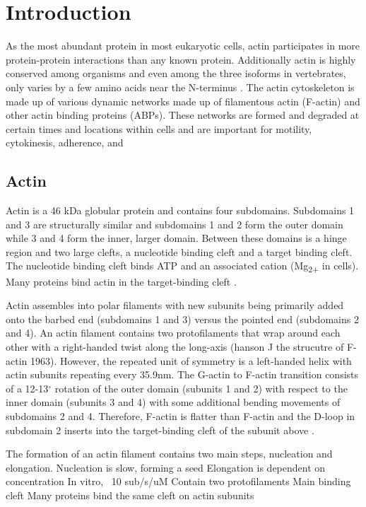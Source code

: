\chapter{Introduction}\label{ch:intro}
As the most abundant protein in most eukaryotic cells, actin participates in more protein-protein interactions than any known protein. Additionally actin is highly conserved among organisms and even among the three isoforms in vertebrates, only varies by a few amino acids near the N-terminus \cite{dominguez_actin_2011}. 
The actin cytoskeleton is made up of various dynamic networks made up of filamentous actin (F-actin) and other actin binding proteins (ABPs). These networks are formed and degraded at certain times and locations within cells and are important for motility, cytokinesis, adherence, and %

\section{Actin}\label{actin-intro}

Actin is a 46 kDa globular protein and contains four subdomains. Subdomains 1 and 3 are structurally similar and subdomains 1 and 2 form the outer domain while 3 and 4 form the inner, larger domain. Between these domains is a hinge region and two large clefts, a nucleotide binding cleft and a target binding cleft. The nucleotide binding cleft binds ATP and an associated cation (Mg\textsubscript{2+} in cells). Many proteins bind actin in the target-binding cleft \citep{dominguez_actin_2009}.

Actin assembles into polar filaments with new subunits being primarily added onto the barbed end (subdomains 1 and 3) versus the pointed end (subdomains 2 and 4). An actin filament contains two protofilaments that wrap around each other with a right-handed twist along the long-axis (hanson J the strucutre of F-actin 1963). However, the repeated unit of symmetry is a left-handed helix with  actin subunits repeating every 35.9nm. The G-actin to F-actin transition consists of a 12-13$^\circ$ rotation of the outer domain (subunits 1 and 2) with respect to the inner domain (subunits 3 and 4) with some additional bending movements of subdomains 2 and 4. Therefore, F-actin is flatter than F-actin and the D-loop in subdomain 2 inserts into the target-binding cleft of the subunit above \citep{dominguez_actin_2011}.

The formation of an actin filament contains two main steps, nucleation and elongation. 
Nucleation is slow, forming a seed
Elongation is dependent on concentration
In vitro, ~10 sub/s/uM
Contain two protofilaments 
Main binding cleft
Many proteins bind the same cleft on actin subunits

